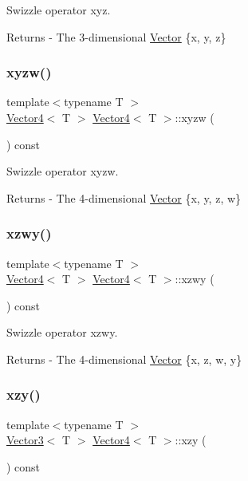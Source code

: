 Swizzle operator xyz. \begin{DoxyReturn}{Returns}
-\/ The 3-\/dimensional \mbox{\hyperlink{class_vector}{Vector}} \{x, y, z\} 
\end{DoxyReturn}
\mbox{\label{class_vector4_a0d500980b978b94728d6eefe536aa4eb}} 
\subsubsection{\texorpdfstring{xyzw()}{xyzw()}}
{\footnotesize\ttfamily template$<$typename T $>$ \\
\mbox{\hyperlink{class_vector4}{Vector4}}$<$ T $>$ \mbox{\hyperlink{class_vector4}{Vector4}}$<$ T $>$\+::xyzw (\begin{DoxyParamCaption}{ }\end{DoxyParamCaption}) const}

Swizzle operator xyzw. \begin{DoxyReturn}{Returns}
-\/ The 4-\/dimensional \mbox{\hyperlink{class_vector}{Vector}} \{x, y, z, w\} 
\end{DoxyReturn}
\mbox{\label{class_vector4_a7c2c94c8c945e72f80891cd90a7efceb}} 
\subsubsection{\texorpdfstring{xzwy()}{xzwy()}}
{\footnotesize\ttfamily template$<$typename T $>$ \\
\mbox{\hyperlink{class_vector4}{Vector4}}$<$ T $>$ \mbox{\hyperlink{class_vector4}{Vector4}}$<$ T $>$\+::xzwy (\begin{DoxyParamCaption}{ }\end{DoxyParamCaption}) const}

Swizzle operator xzwy. \begin{DoxyReturn}{Returns}
-\/ The 4-\/dimensional \mbox{\hyperlink{class_vector}{Vector}} \{x, z, w, y\} 
\end{DoxyReturn}
\mbox{\label{class_vector4_a63e5ff911ce1b46e4e7d20bfbb332609}} 
\subsubsection{\texorpdfstring{xzy()}{xzy()}}
{\footnotesize\ttfamily template$<$typename T $>$ \\
\mbox{\hyperlink{class_vector3}{Vector3}}$<$ T $>$ \mbox{\hyperlink{class_vector4}{Vector4}}$<$ T $>$\+::xzy (\begin{DoxyParamCaption}{ }\end{DoxyParamCaption}) const}

